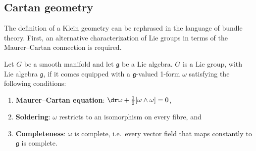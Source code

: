 
\subsection{Cartan geometry}

    The definition of a Klein geometry can be rephrased in the language of bundle theory. First, an alternative characterization of Lie groups in terms of the Maurer--Cartan connection is required.
    \begin{adefinition}
        Let $G$ be a smooth manifold and let $\mathfrak{g}$ be a Lie algebra. $G$ is a Lie group, with Lie algebra $\mathfrak{g}$, if it comes equipped with a $\mathfrak{g}$-valued 1-form $\omega$ satisfying the following conditions:
        \begin{enumerate}
            \item\textbf{Maurer--Cartan equation}: $\dr\omega + \frac{1}{2}[\omega\wedge\omega]=0$,
            \item\textbf{Soldering}: $\omega$ restricts to an isomorphism on every fibre, and
            \item\textbf{Completeness}: $\omega$ is complete, i.e.~every vector field that maps constantly to $\mathfrak{g}$ is complete.
        \end{enumerate}

    \end{adefinition}

